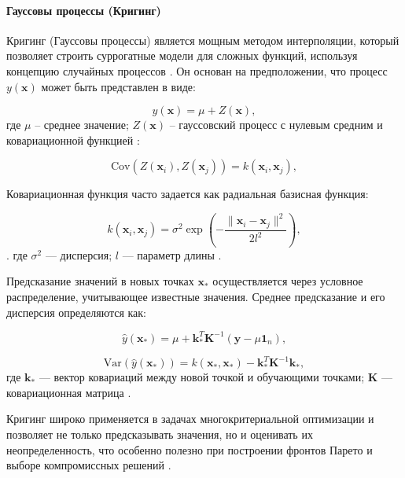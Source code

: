 \paragraph{Гауссовы процессы (Кригинг)}\label{sec:ch4/sec3/subsec1/subsubsec3}

Кригинг (Гауссовы процессы) является мощным методом интерполяции,
который позволяет строить суррогатные модели для сложных функций,
используя концепцию случайных процессов \cite{gramacy2020surrogates}. Он основан
на предположении, что процесс \( y(\mathbf{x}) \) может быть представлен в виде:

\begin{equation}
	y(\mathbf{x}) = \mu + Z(\mathbf{x}),
\end{equation}
где $\mu$ -- среднее значение; $Z(\mathbf{x})$ -- гауссовский процесс с нулевым средним и
ковариационной функцией \cite{marrel2024probabilistic}:

\begin{equation}
	\text{Cov}(Z(\mathbf{x}_i), Z(\mathbf{x}_j)) = k(\mathbf{x}_i, \mathbf{x}_j),
\end{equation}

Ковариационная функция часто задается как радиальная базисная функция:

\begin{equation}
	k(\mathbf{x}_i, \mathbf{x}_j) = \sigma^2 \exp\left(-\frac{\|\mathbf{x}_i - \mathbf{x}_j\|^2}{2l^2}\right),
\end{equation}.
где \( \sigma^2 \) — дисперсия;
$l$ — параметр длины \cite{figueroa2021gaussian}.

Предсказание значений в новых точках $\mathbf{x}_*$ осуществляется через условное распределение, учитывающее известные значения.
Среднее предсказание и его дисперсия определяются как:

\begin{equation}
	\hat{y}(\mathbf{x}_*) = \mu + \mathbf{k}_*^T \mathbf{K}^{-1} (\mathbf{y} - \mu \mathbf{1}_n),
\end{equation}

\begin{equation}
	\text{Var}(\hat{y}(\mathbf{x}_*)) = k(\mathbf{x}_*, \mathbf{x}_*) - \mathbf{k}_*^T \mathbf{K}^{-1} \mathbf{k}_*,
\end{equation}
где $\mathbf{k}_*$ — вектор ковариаций между новой точкой и обучающими точками;
$\mathbf{K}$ — ковариационная матрица \cite{zhou2020enhanced}.

Кригинг широко применяется в задачах многокритериальной оптимизации и позволяет
не только предсказывать значения, но и оценивать их неопределенность, что особенно
полезно при построении фронтов Парето и выборе компромиссных решений \cite{radaideh2020surrogate}.

